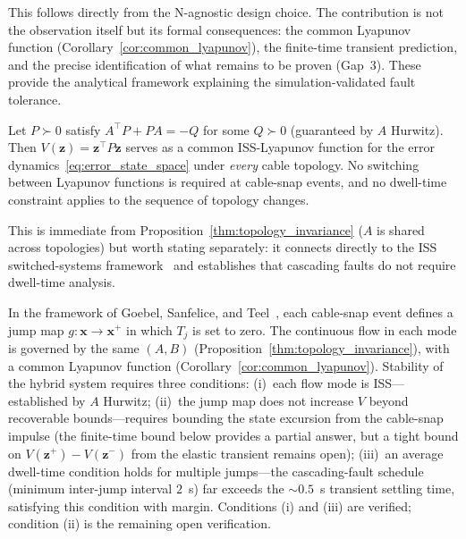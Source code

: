 This follows directly from the N-agnostic design choice. The contribution is not the observation itself but its formal consequences: the common Lyapunov function (Corollary~\ref{cor:common_lyapunov}), the finite-time transient prediction, and the precise identification of what remains to be proven (Gap~3). These provide the analytical framework explaining the simulation-validated fault tolerance.

\begin{corollary}\label{cor:common_lyapunov}
Let $P \succ 0$ satisfy $A^\top P + PA = -Q$ for some $Q \succ 0$ (guaranteed by $A$ Hurwitz). Then $V(\bm{z}) = \bm{z}^\top P \bm{z}$ serves as a common ISS-Lyapunov function for the error dynamics~\eqref{eq:error_state_space} under \emph{every} cable topology. No switching between Lyapunov functions is required at cable-snap events, and no dwell-time constraint applies to the sequence of topology changes.
\end{corollary}

This is immediate from Proposition~\ref{thm:topology_invariance} ($A$ is shared across topologies) but worth stating separately: it connects directly to the ISS switched-systems framework~\cite{vu2007iss,hespanha1999stability} and establishes that cascading faults do not require dwell-time analysis.

\begin{remark}
In the framework of Goebel, Sanfelice, and Teel~\cite{goebel2012hybrid}, each cable-snap event defines a jump map $g: \bm{x} \to \bm{x}^+$ in which $T_j$ is set to zero. The continuous flow in each mode is governed by the same $(A, B)$ (Proposition~\ref{thm:topology_invariance}), with a common Lyapunov function (Corollary~\ref{cor:common_lyapunov}). Stability of the hybrid system requires three conditions: (i)~each flow mode is ISS---established by $A$ Hurwitz; (ii)~the jump map does not increase $V$ beyond recoverable bounds---requires bounding the state excursion from the cable-snap impulse (the finite-time bound below provides a partial answer, but a tight bound on $V(\bm{z}^+) - V(\bm{z}^-)$ from the elastic transient remains open); (iii)~an average dwell-time condition holds for multiple jumps---the cascading-fault schedule (minimum inter-jump interval $2$~s) far exceeds the ${\sim}0.5$~s transient settling time, satisfying this condition with margin. Conditions (i) and (iii) are verified; condition (ii) is the remaining open verification.
\end{remark}

